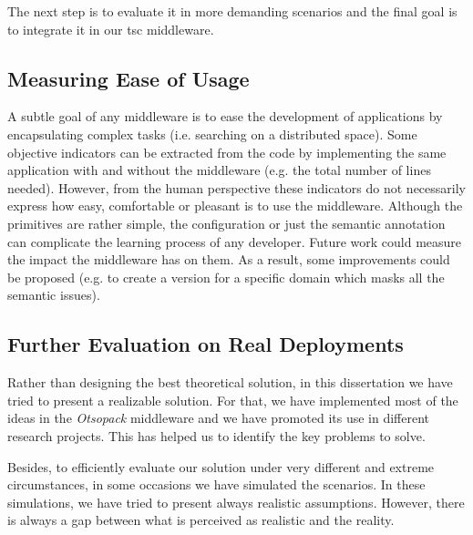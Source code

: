 The next step is to evaluate it in more demanding scenarios and the final goal is to integrate it in our \ac{tsc} middleware.




\subsection{Measuring Ease of Usage}

A subtle goal of any middleware is to ease the development of applications by encapsulating complex tasks (i.e. searching on a distributed space).
Some objective indicators can be extracted from the code by implementing the same application with and without the middleware (e.g. the total number of lines needed).
However, from the human perspective these indicators do not necessarily express how easy, comfortable or pleasant is to use the middleware.
Although the primitives are rather simple, the configuration or just the semantic annotation can complicate the learning process of any developer.
Future work could measure the impact the middleware has on them.
As a result, some improvements could be proposed (e.g. to create a version for a specific domain which masks all the semantic issues).


\subsection{Further Evaluation on Real Deployments}

Rather than designing the best theoretical solution, in this dissertation we have tried to present a realizable solution.
For that, we have implemented most of the ideas in the \emph{Otsopack} middleware and we have promoted its use in different research projects.
This has helped us to identify the key problems to solve.

Besides, to efficiently evaluate our solution under very different and extreme circumstances, in some occasions we have simulated the scenarios. %
In these simulations, we have tried to present always realistic assumptions.
However, there is always a gap between what is perceived as realistic and the reality.

